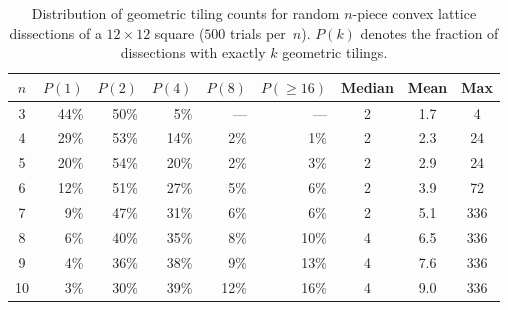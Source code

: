 \documentclass[12pt]{article}
\theoremstyle{definition}
\theoremstyle{remark}
\begin{document}
\begin{table}[ht]
\centering
\caption{Distribution of geometric tiling counts for random $n$-piece
  convex lattice dissections of a $12 \times 12$ square ($500$ trials
  per~$n$). $P(k)$ denotes the fraction of dissections with exactly $k$
  geometric tilings.}
\label{tab:distribution}
\medskip
\begin{tabular}{@{}c r r r r r c c c@{}}
\toprule
$n$ & $P(1)$ & $P(2)$ & $P(4)$ & $P(8)$ & $P(\geq 16)$ & Median & Mean & Max \\
\midrule
3  & 44\% & 50\% &  5\% & ---  & ---  & 2 &  1.7 &    4 \\
4  & 29\% & 53\% & 14\% &  2\% &  1\% & 2 &  2.3 &   24 \\
5  & 20\% & 54\% & 20\% &  2\% &  3\% & 2 &  2.9 &   24 \\
6  & 12\% & 51\% & 27\% &  5\% &  6\% & 2 &  3.9 &   72 \\
7  &  9\% & 47\% & 31\% &  6\% &  6\% & 2 &  5.1 &  336 \\
8  &  6\% & 40\% & 35\% &  8\% & 10\% & 4 &  6.5 &  336 \\
9  &  4\% & 36\% & 38\% &  9\% & 13\% & 4 &  7.6 &  336 \\
10 &  3\% & 30\% & 39\% & 12\% & 16\% & 4 &  9.0 &  336 \\
\bottomrule
\end{tabular}
\end{table}
\end{document}
